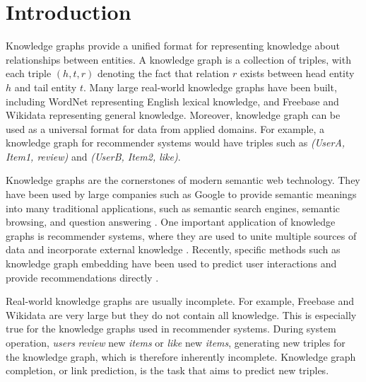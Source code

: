 \documentclass[sigconf,edbt]{acmart-edbt2019}
\begin{document}
\maketitle              
\section{Introduction}
Knowledge graphs provide a unified format for representing knowledge about relationships between entities. A knowledge graph is a collection of triples, with each triple $ (h, t, r) $ denoting the fact that relation $ r $ exists between head entity $ h $ and tail entity $ t $. Many large real-world knowledge graphs have been built, including WordNet \cite{millergeorgea._wordnetlexicaldatabase_1995} representing English lexical knowledge, and Freebase \cite{bollacker_freebasecollaborativelycreated_2008} and Wikidata \cite{vrandecic_wikidatafreecollaborative_2014} representing general knowledge. Moreover, knowledge graph can be used as a universal format for data from applied domains. For example, a knowledge graph for recommender systems would have triples such as \textit{(UserA, Item1, review)} and \textit{(UserB, Item2, like)}.

Knowledge graphs are the cornerstones of modern semantic web technology. They have been used by large companies such as Google to provide semantic meanings into many traditional applications, such as semantic search engines, semantic browsing, and question answering \cite{amitsinghal_officialgoogleblog_2012}. One important application of knowledge graphs is recommender systems, where they are used to unite multiple sources of data and incorporate external knowledge \cite{carrer-neto_socialknowledgebasedrecommender_2012} \cite{zhang_collaborativeknowledgebase_2016}. Recently, specific methods such as knowledge graph embedding have been used to predict user interactions and provide recommendations directly \cite{he_translationbasedrecommendation_2017}.

Real-world knowledge graphs are usually incomplete. For example, Freebase and Wikidata are very large but they do not contain all knowledge. This is especially true for the knowledge graphs used in recommender systems. During system operation, \textit{users} \textit{review} new \textit{items} or \textit{like} new \textit{items}, generating new triples for the knowledge graph, which is therefore inherently incomplete. Knowledge graph completion, or link prediction, is the task that aims to predict new triples.
\end{document}
